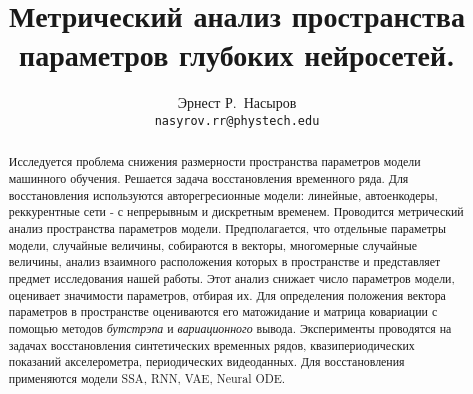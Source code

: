 \documentclass{article}
\title{Метрический анализ пространства параметров глубоких нейросетей.}
\author{Эрнест Р.~Насыров \\
	\texttt{nasyrov.rr@phystech.edu} \\
    }
\begin{document}
\maketitle

\begin{abstract}

Исследуется проблема снижения размерности пространства параметров модели машинного обучения. Решается задача восстановления временного ряда. Для восстановления используются авторегресионные модели: линейные, автоенкодеры, реккурентные сети - с непрерывным и дискретным временем. Проводится метрический анализ пространства параметров модели.  Предполагается, что отдельные параметры модели, случайные величины, собираются в векторы, многомерные случайные величины, анализ взаимного расположения которых в пространстве и представляет предмет исследования нашей работы.  Этот анализ снижает число параметров модели, оценивает значимости параметров, отбирая их. Для определения положения вектора параметров в пространстве оцениваются его матожидание и матрица ковариации с помощью методов \textit{бутстрэпа} и \textit{вариационного} вывода. Эксперименты проводятся на задачах восстановления синтетических временных рядов, квазипериодических показаний акселерометра, периодических видеоданных. Для восстановления применяются модели SSA, RNN, VAE, Neural ODE.


\begin{comment}
В работе исследуется проблема снижения размерности пространства параметров модели. В ее рамках решается задача восстановления временного ряда. В качестве модели восстановления ряда используются различные автоенкодеры. В работе проводится метрический анализ пространства параметров автоенкодера. Новизна заключается в том, что отдельные параметры модели - случайные величины - собираются в векторы – многомерные случайные величины, анализ взаимного расположения которых в пространстве и представляет предмет исследования нашей работы. Этот анализ позволит снизить количество параметров модели, сделать выводы о значимости параметров, произвести их отбор. Для определения положения вектора параметров в пространстве оцениваются его матожидание и матрица ковариации с помощью методов bootstrap и variational inference. Эксперименты проводятся на моделях SSA, RNN и VAE на задачах предсказания синтетических временных рядов, квазипериодических показаний акселерометра, периодических видеоданных.
\end{comment}
\end{abstract}
\end{document}
